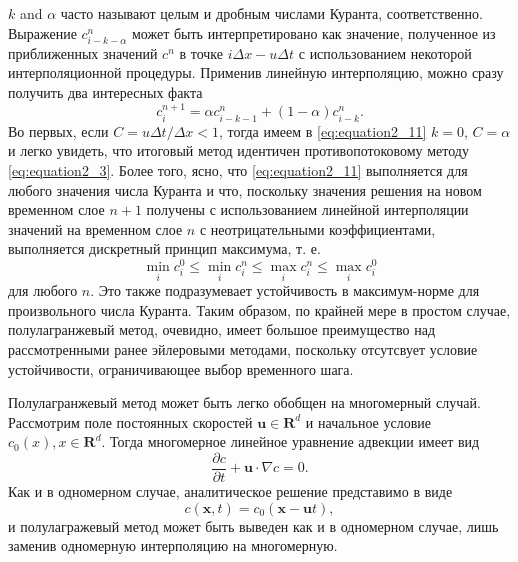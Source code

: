 $k$ and $\alpha$ часто называют целым и дробным числами Куранта, соответственно. Выражение $c_{i-k-\alpha}^n$ может быть интерпретировано как значение, полученное из приближенных значений $c^n$ в точке $i\Delta x - u\Delta t$ с использованием некоторой интерполяционной процедуры. Применив линейную интерполяцию, можно сразу получить два интересных факта
%
\begin{equation}
\label{eq:equation2_11}
c_i^{n+1} = \alpha c_{i-k-1}^{n} + (1-\alpha)c_{i-k}^n.
\end{equation}
%
Во первых, если $C = u\Delta t/\Delta x < 1$, тогда имеем в \eqref{eq:equation2_11} $k=0$, $C=\alpha$ и  легко увидеть, что итоговый метод идентичен противопотоковому методу \eqref{eq:equation2_3}. Более того,
ясно, что \eqref{eq:equation2_11} выполняется для любого значения числа Куранта и что, поскольку значения решения на новом временном слое $n+1$ получены с использованием линейной интерполяции значений на временном слое $n$ с неотрицательными коэффициентами, выполняется дискретный принцип максимума, т. е.
%
\begin{equation}
\label{eq:equation2_12}
\min_i c_i^0 \le \min_i c_i^n \le \max_i c_i^n \le \max_i c_i^0
\end{equation}
%
для любого $n$. Это также подразумевает устойчивость в максимум-норме для произвольного числа Куранта. Таким образом, по крайней мере в простом случае, полулагранжевый метод, очевидно, имеет большое преимущество над рассмотренными ранее эйлеровыми методами, поскольку отсутсвует условие устойчивости, ограничивающее выбор временного шага.

Полулагранжевый метод может быть легко обобщен на многомерный случай. Рассмотрим поле постоянных скоростей $\mathbf{u}\in\mathbf{R}^d$ и начальное условие $c_0(x), x\in\mathbf{R}^d$. Тогда многомерное линейное уравнение адвекции имеет вид
%
\begin{equation}
\label{eq:equation2_13}
\frac{\partial{c}}{\partial{t}} + \mathbf{u} \cdot \nabla c = 0.
\end{equation}
%
Как и в одномерном случае, аналитическое решение представимо в виде
%
\begin{equation}
\label{eq:equation2_14}
c(\mathbf{x}, t) = c_0(\mathbf{x} - \mathbf{u}t),
\end{equation}
%
и полулагражевый метод может быть выведен как и в одномерном случае, лишь заменив одномерную интерполяцию на многомерную.
	
